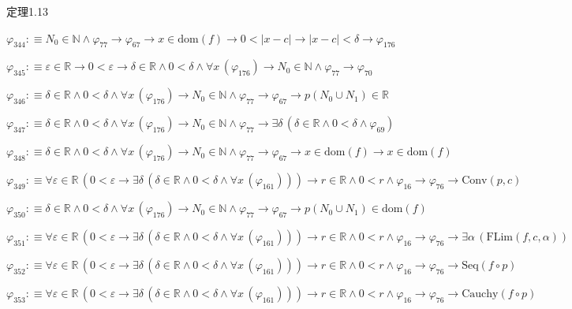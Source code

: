 \begin{fullproof}{定理1.13}
\begin{abbrevlist}
\item $\varphi_{344} :\equiv N_{0} \in \mathbb{N} \land \varphi_{77} \to \varphi_{67} \to x \in \mathrm{dom}(f) \to 0 < \lvert x - c \rvert \to \lvert x - c \rvert < \delta \to \varphi_{176}$
\item $\varphi_{345} :\equiv \varepsilon \in \mathbb{R} \to 0 < \varepsilon \to \delta \in \mathbb{R} \land 0 < \delta \land \forall x\,(\varphi_{176}) \to N_{0} \in \mathbb{N} \land \varphi_{77} \to \varphi_{70}$
\item $\varphi_{346} :\equiv \delta \in \mathbb{R} \land 0 < \delta \land \forall x\,(\varphi_{176}) \to N_{0} \in \mathbb{N} \land \varphi_{77} \to \varphi_{67} \to p(N_{0} \cup N_{1}) \in \mathbb{R}$
\item $\varphi_{347} :\equiv \delta \in \mathbb{R} \land 0 < \delta \land \forall x\,(\varphi_{176}) \to N_{0} \in \mathbb{N} \land \varphi_{77} \to \exists \delta\,(\delta \in \mathbb{R} \land 0 < \delta \land \varphi_{69})$
\item $\varphi_{348} :\equiv \delta \in \mathbb{R} \land 0 < \delta \land \forall x\,(\varphi_{176}) \to N_{0} \in \mathbb{N} \land \varphi_{77} \to \varphi_{67} \to x \in \mathrm{dom}(f) \to x \in \mathrm{dom}(f)$
\item $\varphi_{349} :\equiv \forall \varepsilon \in \mathbb{R}\,(0 < \varepsilon \to \exists \delta\,(\delta \in \mathbb{R} \land 0 < \delta \land \forall x\,(\varphi_{161}))) \to r \in \mathbb{R} \land 0 < r \land \varphi_{16} \to \varphi_{76} \to \mathrm{Conv}(p,c)$
\item $\varphi_{350} :\equiv \delta \in \mathbb{R} \land 0 < \delta \land \forall x\,(\varphi_{176}) \to N_{0} \in \mathbb{N} \land \varphi_{77} \to \varphi_{67} \to p(N_{0} \cup N_{1}) \in \mathrm{dom}(f)$
\item $\varphi_{351} :\equiv \forall \varepsilon \in \mathbb{R}\,(0 < \varepsilon \to \exists \delta\,(\delta \in \mathbb{R} \land 0 < \delta \land \forall x\,(\varphi_{161}))) \to r \in \mathbb{R} \land 0 < r \land \varphi_{16} \to \varphi_{76} \to \exists \alpha\,(\mathrm{FLim}(f,c,\alpha))$
\item $\varphi_{352} :\equiv \forall \varepsilon \in \mathbb{R}\,(0 < \varepsilon \to \exists \delta\,(\delta \in \mathbb{R} \land 0 < \delta \land \forall x\,(\varphi_{161}))) \to r \in \mathbb{R} \land 0 < r \land \varphi_{16} \to \varphi_{76} \to \mathrm{Seq}(f \circ p)$
\item $\varphi_{353} :\equiv \forall \varepsilon \in \mathbb{R}\,(0 < \varepsilon \to \exists \delta\,(\delta \in \mathbb{R} \land 0 < \delta \land \forall x\,(\varphi_{161}))) \to r \in \mathbb{R} \land 0 < r \land \varphi_{16} \to \varphi_{76} \to \mathrm{Cauchy}(f \circ p)$

\end{abbrevlist}
\end{fullproof}
